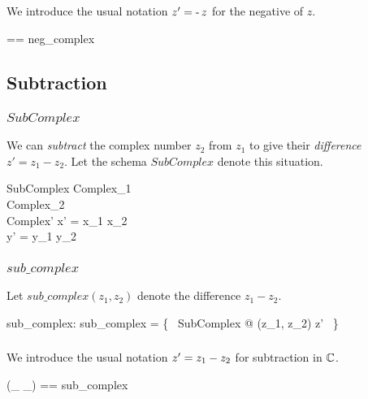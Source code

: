 \documentclass[11pt, oneside]{article}
\begin{document}
\subsubsection{}

We introduce the usual notation $z' = \operatorname{-} z$ for the negative of $z$.
\begin{zed}
	\negC == neg\_complex
\end{zed}

\subsection{Subtraction}

\subsubsection{$SubComplex$}

We can \textit{subtract} the complex number $z_2$ from $z_1$
to give their \textit{difference} $z' = z_1 - z_2$.
Let the schema $SubComplex$ denote this situation.

\begin{schema}{SubComplex}
	Complex_1 \\
	Complex_2 \\
	Complex'
\where
	x' = x_1 \subR x_2 \\
	y' = y_1 \subR y_2
\end{schema}

\subsubsection{$sub\_complex$}

Let $sub\_complex(z_1, z_2)$ denote the difference $z_1 - z_2$.

\begin{axdef}
	sub\_complex: \C \cross \C \fun \C
\where
	sub\_complex = \{~ SubComplex @ (z_1, z_2) \mapsto z' ~\}
\end{axdef}

\subsubsection{}

We introduce the usual notation $z' = z_1 \mathbin{-} z_2$ for subtraction in $\mathbb{C}$.

\begin{zed}
	(\_ \subC \_) == sub\_complex
\end{zed}
\end{document}
